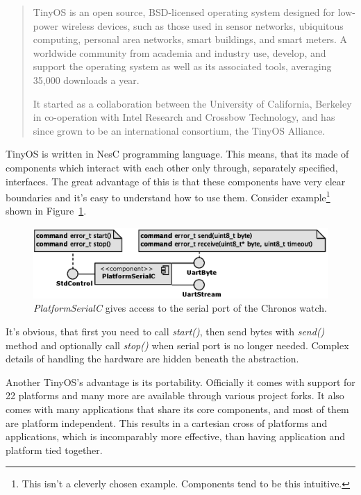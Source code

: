 \begin{quotation}
TinyOS is an open source, BSD-licensed operating system designed for
low-power wireless devices, such as those used in sensor networks,
ubiquitous computing, personal area networks, smart buildings, and
smart meters. A worldwide community from academia and industry use,
develop, and support the operating system as well as its associated
tools, averaging 35,000 downloads a year.

It started as a collaboration between the University of
California, Berkeley in co-operation with Intel Research and Crossbow
Technology, and has since grown to be an international consortium, the
TinyOS Alliance.

{\hfill \cite{TOSnet,TOSw}}
\end{quotation}
TinyOS is written in NesC programming language. This means, that its
made of components which interact with each other only through,
separately specified, interfaces. The great advantage of this is
that these components have very clear boundaries and it's easy to
understand how to use them. Consider example\footnote{This isn't a
cleverly chosen example. Components tend to be this intuitive.} shown
in Figure~\ref{fig:platform_serial}.
\begin{figure}[h]
  \centering
  \includegraphics{diagrams/platform_serial.eps}
  \caption{\emph{PlatformSerialC} gives access to the serial port of the 
           Chronos watch.}
  \label{fig:platform_serial}
\end{figure}
It's obvious, that first you need to call \emph{start()}, then send
bytes with \emph{send()} method and optionally call \emph{stop()} when
serial port is no longer needed. Complex details of handling the
hardware are hidden beneath the abstraction.

Another TinyOS's advantage is its portability. Officially it comes
with support for 22 platforms and many more are available through
various project forks. It also comes with many applications that share
its core components, and most of them are platform independent. This
results in a cartesian cross of platforms and applications, which is
incomparably more effective, than having application and platform
tied together.

